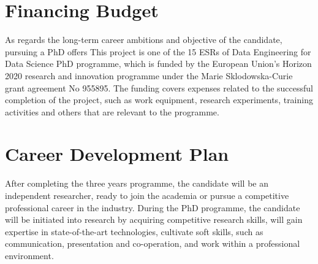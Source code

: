 \documentclass[12pt]{article}
\begin{document}
\section{Financing Budget}
As regards the long-term career ambitions and objective of the candidate, pursuing a PhD offers 
This project is one of the 15 ESRs of Data Engineering for Data Science PhD programme, which is funded by the European Union's Horizon 2020 research and innovation programme under the Marie Sklodowska-Curie grant agreement No 955895. The funding covers expenses related to the successful completion of the project, such as work equipment, research experiments, training activities and others
that are relevant to the programme.



\section{Career Development Plan}
After completing the three years 
programme, the candidate will be an independent researcher, ready to join the academia or pursue a competitive professional career in the industry. 
During the PhD programme, the candidate will be initiated 
into research by acquiring competitive research skills, will gain expertise in state-of-the-art technologies, 
cultivate soft skills, such as communication, presentation and co-operation, and work within a professional environment.


%
\printbibliography{}

\end{document}
